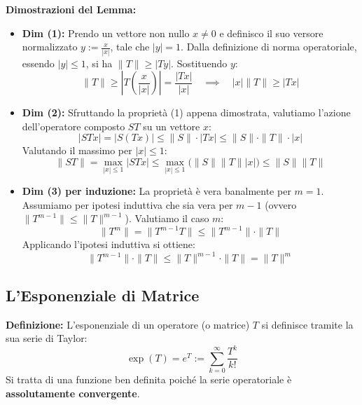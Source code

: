 \documentclass[openany]{book}
\theoremstyle{definition}
\theoremstyle{remark}
\begin{document}
\textbf{Dimostrazioni del Lemma:}
\begin{itemize}
    \item \textbf{Dim (1):} Prendo un vettore non nullo $x \neq 0$ e definisco il suo versore normalizzato $y := \frac{x}{|x|}$, tale che $|y| = 1$. Dalla definizione di norma operatoriale, essendo $|y| \le 1$, si ha $\|T\| \ge |Ty|$. Sostituendo $y$:
    \begin{equation*}
        \|T\| \ge \left|T\left(\frac{x}{|x|}\right)\right| = \frac{|Tx|}{|x|} \quad \implies \quad |x|\|T\| \ge |Tx|
    \end{equation*}
    
    \item \textbf{Dim (2):} Sfruttando la proprietà (1) appena dimostrata, valutiamo l'azione dell'operatore composto $ST$ su un vettore $x$:
    \begin{equation*}
        |STx| = |S(Tx)| \le \|S\| \cdot |Tx| \le \|S\| \cdot \|T\| \cdot |x|
    \end{equation*}
    Valutando il massimo per $|x| \le 1$:
    \begin{equation*}
        \|ST\| = \max_{|x| \le 1} |STx| \le \max_{|x| \le 1} \big(\|S\| \|T\| |x|\big) \le \|S\| \|T\|
    \end{equation*}
    
    \item \textbf{Dim (3) per induzione:} 
    La proprietà è vera banalmente per $m=1$. Assumiamo per ipotesi induttiva che sia vera per $m-1$ (ovvero $\|T^{m-1}\| \le \|T\|^{m-1}$). Valutiamo il caso $m$:
    \begin{equation*}
        \|T^m\| = \|T^{m-1}T\| \le \|T^{m-1}\| \cdot \|T\|
    \end{equation*}
    Applicando l'ipotesi induttiva si ottiene:
    \begin{equation*}
        \|T^{m-1}\| \cdot \|T\| \le \|T\|^{m-1} \cdot \|T\| = \|T\|^m
    \end{equation*}
\end{itemize}


\subsection*{L'Esponenziale di Matrice}

\textbf{Definizione:} L'esponenziale di un operatore (o matrice) $T$ si definisce tramite la sua serie di Taylor:
\begin{equation}
    \exp(T) = e^T := \sum_{k=0}^{\infty} \frac{T^k}{k!}
\end{equation}
Si tratta di una funzione ben definita poiché la serie operatoriale è \textbf{assolutamente convergente}. 
\end{document}
